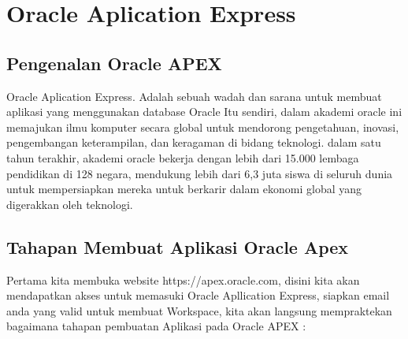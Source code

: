 \chapter{Oracle Aplication Express}

\section{Pengenalan Oracle APEX}
Oracle Aplication Express\cite{OracleApex}. Adalah sebuah wadah dan sarana untuk membuat aplikasi yang menggunakan database Oracle Itu sendiri, dalam akademi oracle ini memajukan ilmu komputer secara global untuk mendorong pengetahuan, inovasi, pengembangan keterampilan, dan keragaman di bidang teknologi. dalam satu tahun terakhir, akademi oracle bekerja dengan lebih dari 15.000 lembaga pendidikan di 128 negara, mendukung lebih dari 6,3 juta siswa di seluruh dunia untuk mempersiapkan mereka untuk berkarir dalam ekonomi global yang digerakkan oleh teknologi.

\section{Tahapan Membuat Aplikasi Oracle Apex}
Pertama kita membuka website https://apex.oracle.com, disini kita akan mendapatkan akses untuk memasuki Oracle Apllication Express, siapkan email anda yang valid untuk membuat Workspace, kita akan langsung mempraktekan bagaimana tahapan pembuatan Aplikasi pada Oracle APEX :

